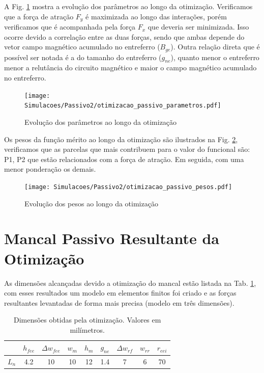 A Fig. \ref{fig:otimizacao_passivo_parametros} mostra a evolução dos parâmetros ao longo da otimização. Verificamos que a força de atração $F_y$ é maximizada ao longo das interações, porém verificamos que é acompanhada pela força $F_x$ que deveria ser minimizada. Isso ocorre devido a correlação entre as duas forças, sendo que ambas depende do vetor campo magnético acumulado no entreferro ($B_{ge}$). Outra relação direta que é possível ser notada é a do tamanho do entreferro ($g_{ne}$), quanto menor o entreferro menor a relutância do circuito magnético e maior o campo magnético acumulado no entreferro.


\begin{figure}[bh!]
	\centering
	\texttt{[image: Simulacoes/Passivo2/otimizacao\_passivo\_parametros.pdf]}
	\caption{Evolução dos parâmetros ao longo da otimização}
	\label{fig:otimizacao_passivo_parametros}
\end{figure} 

Os pesos da função mérito ao longo da otimização são ilustrados na Fig. \ref{fig:otimizacao_passivo_pesos}, verificamos que as parcelas que mais contribuem para o valor do funcional são: P1, P2 que estão relacionados com a força de atração. Em seguida, com uma menor ponderação os demais. 

\begin{figure}[th!]
	\centering
	\texttt{[image: Simulacoes/Passivo2/otimizacao\_passivo\_pesos.pdf]}
	\caption{Evolução dos pesos ao longo da otimização}
	\label{fig:otimizacao_passivo_pesos}
\end{figure} 

\section{Mancal Passivo Resultante da Otimização}

As dimensões alcançadas devido a otimização do mancal estão listada na Tab. \ref{tab:passivo:dimensoes:otimizado}, com esses resultados um modelo em elementos finitos foi criado e as forças resultantes levantadas de forma mais precisa (modelo em três dimensões).

\begin{table}[ht!]
	\centering
	\begin{tabular}{c c c c c c c c c}
		& $h_{fee}$ &$\Delta w_{fee}$ & $w_m$ & $h_m$  & $g_{ne}$ & $\Delta w_{rf}$ & $w_{rr}$ & $r_{eei}$ \\ \hline \hline
		$L_{n}$  	&  4.2 &   10 &   10 &    12 &   1.4 &  7 &   6 &    70 \\
	\end{tabular} 
	\caption{Dimensões obtidas pela otimização. Valores em milímetros.}
	\label{tab:passivo:dimensoes:otimizado} 
\end{table}

